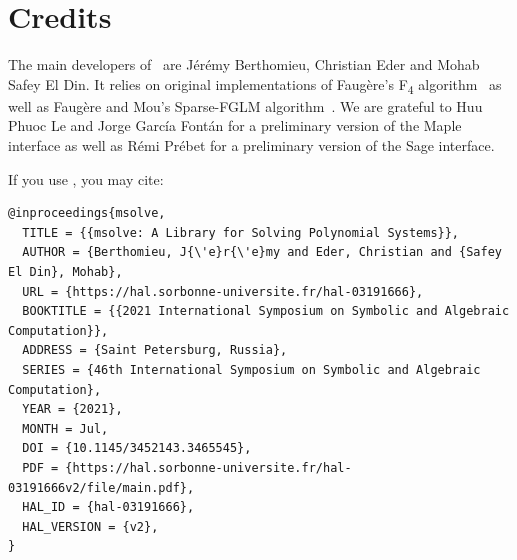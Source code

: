 \documentclass[a4paper,english,11pt]{scrartcl}
\theoremstyle{definition}
\theoremstyle{remark}
\newcommand\Fquatre{\textsc{\texorpdfstring{F\textsubscript{4}}{F4}}\xspace}
\begin{document}
\section{Credits}

The main developers of \msolve~are J\'er\'emy Berthomieu, Christian Eder and
Mohab Safey El Din. It relies on original implementations of Faugère's \Fquatre
algorithm~\cite{F4} as well as Faug\`ere and Mou's Sparse-FGLM
algorithm~\cite{SparseFGLM}. We are grateful to Huu Phuoc Le and Jorge
García Fontán for a
preliminary version of the Maple interface as well as Rémi Prébet for a
preliminary version of the Sage interface.

If you use \msolve, you may cite:
\begin{verbatim}
@inproceedings{msolve,
  TITLE = {{msolve: A Library for Solving Polynomial Systems}},
  AUTHOR = {Berthomieu, J{\'e}r{\'e}my and Eder, Christian and {Safey El Din}, Mohab},
  URL = {https://hal.sorbonne-universite.fr/hal-03191666},
  BOOKTITLE = {{2021 International Symposium on Symbolic and Algebraic Computation}},
  ADDRESS = {Saint Petersburg, Russia},
  SERIES = {46th International Symposium on Symbolic and Algebraic Computation},
  YEAR = {2021},
  MONTH = Jul,
  DOI = {10.1145/3452143.3465545},
  PDF = {https://hal.sorbonne-universite.fr/hal-03191666v2/file/main.pdf},
  HAL_ID = {hal-03191666},
  HAL_VERSION = {v2},
}
\end{verbatim}
\renewcommand*{\bibfont}{\small}
  \printbibliography
\end{document}
